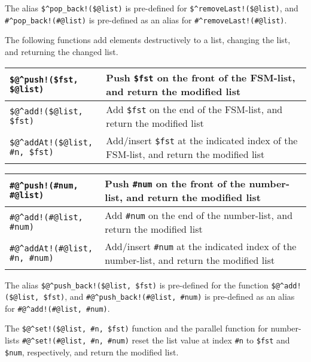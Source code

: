 \vspace{.5cm}

The alias \verb+$^pop_back!($@list)+ is pre-defined for
\verb+$^removeLast!($@list)+, and  \verb+#^pop_back!(#@list)+ is
pre-defined as an alias for \verb+#^removeLast!(#@list)+.

The following functions add elements destructively to a list, changing
the list, and returning the changed list.

\vspace{.5cm}

\noindent
\begin{tabular}{|l|p{6.5cm}|}
\hline
\verb+$@^push!($fst, $@list)+ & Push \verb!$fst! on the front of the FSM-list, and return the
modified list\\
\hline
\verb+$@^add!($@list, $fst)+ & Add \verb!$fst! on the end of the FSM-list, and return the modified
list\\
\hline
\verb+$@^addAt!($@list, #n, $fst)+ & Add/insert \verb!$fst! at the indicated index of
the FSM-list, and return the
modified list\\
\hline
\end{tabular}

\vspace{.5cm}

\noindent
\begin{tabular}{|l|p{6.5cm}|}
\hline
\verb+#@^push!(#num, #@list)+ & Push \verb!#num! on the front of the number-list, and return the
modified list\\
\hline
\verb+#@^add!(#@list, #num)+ & Add \verb!#num! on the end of the number-list, and return the modified
list\\
\hline
\verb+#@^addAt!(#@list, #n, #num)+ & Add/insert \verb!#num! at the indicated index of
the number-list, and return the
modified list\\
\hline
\end{tabular}

\vspace{.5cm}

The alias \verb+$@^push_back!($@list, $fst)+ is pre-defined for the function
\verb+$@^add!($@list, $fst)+, and \verb+#@^push_back!(#@list, #num)+ is pre-defined as an
alias for \verb+#@^add!(#@list, #num)+.

The \verb+$@^set!($@list, #n, $fst)+ function and the parallel function for
number-lists
\verb+#@^set!(#@list, #n, #num)+ reset the list value at index
\verb!#n! to \verb!$fst! and \verb!$num!, respectively, and return the modified list.

